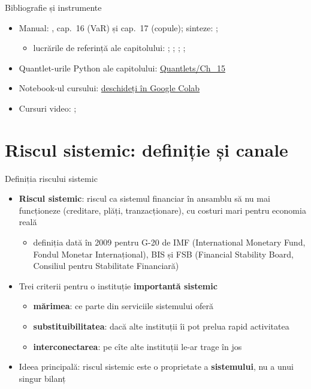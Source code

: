 \begin{frame}{Bibliografie și instrumente}
\itemsize{\small}
\begin{itemize}
    \item Manual: , cap.~16 (VaR) și cap.~17 (copule); sinteze: ; 
    \begin{itemize}
        \item lucrările de referință ale capitolului: ; ; ; ; 
    \end{itemize}
    \item Quantlet-urile Python ale capitolului: \href{https://github.com/danpele/SFM/tree/main/Quantlets/Ch_15}{Quantlets/Ch\_15}
    \item Notebook-ul cursului: \href{\colaburl{notebooks/EN/chapter15_lecture_notebook.ipynb}}{deschideți în Google Colab}
    \item Cursuri video: ; 
\end{itemize}
\end{frame}


\section{Riscul sistemic: definiție și canale}

\begin{frame}{Definiția riscului sistemic}
\itemsize{\small}
\begin{itemize}
    \item \textbf{Riscul sistemic}: riscul ca sistemul financiar în ansamblu să nu mai funcționeze (creditare, plăți, tranzacționare), cu costuri mari pentru economia reală 
    \begin{itemize}
        \item definiția dată în 2009 pentru G-20 de IMF (International Monetary Fund, Fondul Monetar Internațional), BIS și FSB (Financial Stability Board, Consiliul pentru Stabilitate Financiară)
    \end{itemize}
    \item Trei criterii pentru o instituție \textbf{importantă sistemic} 
    \begin{itemize}
        \item \textbf{mărimea}: ce parte din serviciile sistemului oferă
        \item \textbf{substituibilitatea}: dacă alte instituții îi pot prelua rapid activitatea
        \item \textbf{interconectarea}: pe cîte alte instituții le-ar trage în jos
    \end{itemize}
    \item Ideea principală: riscul sistemic este o proprietate a \textbf{sistemului}, nu a unui singur bilanț
\end{itemize}
\end{frame}


